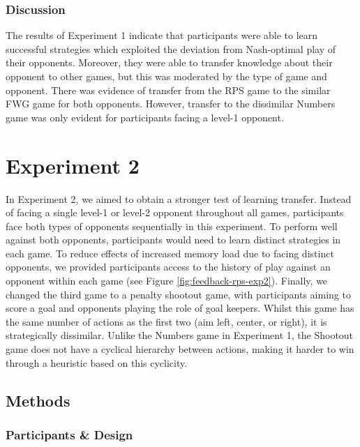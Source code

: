 \documentclass[man,floatsintext]{apa6}
\begin{document}
\hypertarget{discussion}{%
\subsubsection{Discussion}\label{discussion}}

The results of Experiment 1 indicate that participants were able to learn successful strategies which exploited the deviation from Nash-optimal play of their opponents. Moreover, they were able to transfer knowledge about their opponent to other games, but this was moderated by the type of game and opponent. There was evidence of transfer from the RPS game to the similar FWG game for both opponents. However, transfer to the dissimilar Numbers game was only evident for participants facing a level-1 opponent.

\hypertarget{experiment-2}{%
\section{Experiment 2}\label{experiment-2}}

In Experiment 2, we aimed to obtain a stronger test of learning transfer. Instead of facing a single level-1 or level-2 opponent throughout all games, participants face both types of opponents sequentially in this experiment. To perform well against both opponents, participants would need to learn distinct strategies in each game. To reduce effects of increased memory load due to facing distinct opponents, we provided participants access to the history of play against an opponent within each game (see Figure \ref{fig:feedback-rps-exp2}). Finally, we changed the third game to a penalty shootout game, with participants aiming to score a goal and opponents playing the role of goal keepers. Whilst this game has the same number of actions as the first two (aim left, center, or right), it is strategically dissimilar. Unlike the Numbers game in Experiment 1, the Shootout game does not have a cyclical hierarchy between actions, making it harder to win through a heuristic based on this cyclicity.

\hypertarget{methods-1}{%
\subsection{Methods}\label{methods-1}}

\hypertarget{participants-design}{%
\subsubsection{Participants \& Design}\label{participants-design}}
\end{document}
